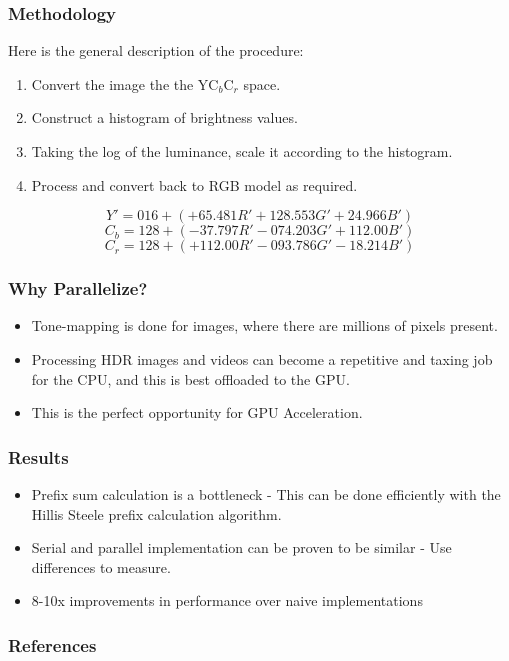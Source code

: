 \documentclass{beamer}
\begin{document}
\begin{frame}
    \frametitle{Methodology}
    Here is the general description of the procedure:
    \begin{enumerate}
        \item Convert the image the the YC$_b$C$_r$ space.
        \item Construct a histogram of brightness values.
        \item Taking the log of the luminance, scale it according to the histogram.
        \item Process and convert back to RGB model as required.
    \end{enumerate}
    \begin{equation*}
        Y' = 016 + (+65.481R'+128.553G'+24.966B')
    \end{equation*}
    \begin{equation*}
        C_b = 128 + (-37.797R'-074.203G'+112.00B')
    \end{equation*}
    \begin{equation*}
        C_r = 128 + (+112.00R'-093.786G'-18.214B')
    \end{equation*}

\end{frame}

\begin{frame}
    \frametitle{Why Parallelize?}
    \begin{itemize}
        \item Tone-mapping is done for images, where there are millions of pixels present.
        \item Processing HDR images and videos can become a repetitive and taxing job for the CPU, and this is best offloaded to the GPU.
        \item This is the perfect opportunity for GPU Acceleration.
    \end{itemize}
    
\end{frame}

\begin{frame}
    \frametitle{Results}
    \begin{itemize}
        \item Prefix sum calculation is a bottleneck - This can be done efficiently with the Hillis Steele prefix calculation algorithm.
        \item Serial and parallel implementation can be proven to be similar - Use differences to measure.
        \item 8-10x improvements in performance over naive implementations
    \end{itemize}
\end{frame}

\begin{frame}
    \frametitle{References}
    \begin{thebibliography}{00}
    \end{thebibliography}    

\end{frame}
\end{document}
